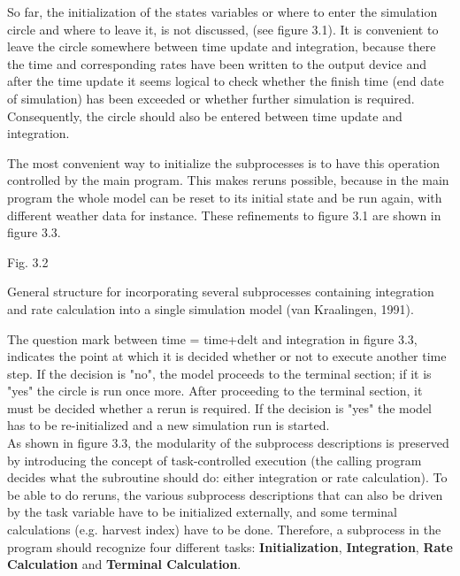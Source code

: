 \documentclass[11pt]{article}
\newcommand{\FigDir}{.}
\begin{document}
\bigskip
\bigskip
\bigskip
\bigskip
\bigskip
\bigskip
\bigskip
So far, the initialization of the states variables or where to enter the simula\-tion circle and
where to leave it, is not discussed, (see figure 3.1). It is convenient to leave the circle
somewhere between time update and integration, because there the time and correspond\-ing rates have been written to the output device and after the time update it seems logical
to check whether the finish time (end date of simulation) has been exceeded or whether
further simulation is required. Consequently, the circle should also be entered between
time update and integration.

\bigskip
The most conve\-nient way to initialize the subprocesses is to have this operation controlled
by the main program. This makes reruns possible, because in the main  program the
whole model can be reset to its initial state and be run again, with different weather data
for instance. These refinements to figure 3.1 are shown in figure 3.3.

\begin{figure}[htbp]
 \begin{center}\epsfig{file=\FigDir/FSE1.eps,width=15.15cm} \end{center}
\end{figure}
Fig. 3.2
\testlastline

\begin{indenting}{2.54cm}
Gen\-er\-al s\-t\-ruc\-t\-ure for in\-corporating several subprocesses containing integra\-tion and rate cal\-culation into a single simulation model (van Kraalingen,
1991).
\end{indenting}

\bigskip
\bigskip
The question mark between time = time+delt and integration in figure 3.3, indicates the
point at which it is decided whether or not to execute another time step. If the decision is
"no", the model proceeds to the terminal section; if it is "yes" the circle is run once
more. After proceeding to the terminal section, it must be decided whether a rerun is
required. If the decision is "yes" the model has to be re-initialized and a new simula\-tion
run is started.\\
 As shown in figure 3.3, the modularity of the subprocess descriptions is preserved by
introducing the concept of task-controlled execution (the calling program decides what the
subroutine should do: either integration or rate calculation). To be able to do reruns, the
various subprocess descriptions that can also be driven by the task variable have to be
initialized externally, and some terminal calculations (e.g. harvest index) have to be done.
Therefore, a subprocess in the program should recognize four different tasks: {\bf Initializa\-tion}, {\bf Integration}, {\bf Rate Calcula\-tion} and {\bf Terminal Calcula\-tion}.
\end{document}
